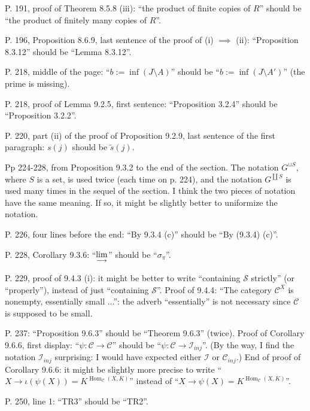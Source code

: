 \documentclass[12pt]{article}
\theoremstyle{remark}%
\newcommand{\n}{\noindent}
\newcommand{\C}{\mathcal C}
\newcommand{\ilim}{\operatornamewithlimits{\underset{\longrightarrow}{lim}}}
\DeclareMathOperator{\Hom}{Hom}
\begin{document}
\n P. 191, proof of Theorem 8.5.8 (iii): ``the product of finite copies of $R$'' should be ``the product of finitely many copies of $R$''.

\n P. 196, Proposition 8.6.9, last sentence of the proof of (i) $\implies$ (ii): ``Proposition 8.3.12'' should be ``Lemma 8.3.12''.

\n P. 218, middle of the page: ``$b:=\inf(J\setminus A)$'' should be ``$b:=\inf(J\setminus A')$'' (the prime is missing).

\n P. 218, proof of Lemma 9.2.5, first sentence: ``Proposition 3.2.4'' should be ``Proposition 3.2.2''.

\n P. 220, part (ii) of the proof of Proposition 9.2.9, last sentence of the first paragraph: $s(j)$ should be $\tilde s(j)$.

\n Pp 224-228, from Proposition 9.3.2 to the end of the section. The notation $G^{\sqcup S}$, where $S$ is a set, is used twice (each time on p. 224), and the notation $G^{\coprod S}$ is used many times in the sequel of the section. I think the two pieces of notation have the same meaning. If so, it might be slightly better to uniformize the notation.

\n P. 226, four lines before the end: ``By 9.3.4 (c)'' should be ``By (9.3.4) (c)''.

\n P. 228, Corollary 9.3.6: ``$\ilim$'' should be ``$\sigma_\pi$''.

\n P. 229, proof of 9.4.3 (i): it might be better to write ``containing $\mathcal S$ strictly'' (or ``properly''), instead of just ``containing $\mathcal S$''. Proof of 9.4.4: ``The category $\C^X$ is nonempty, essentially small ...'': the adverb ``essentially'' is not necessary since $\C$ is supposed to be small.

\n P. 237: ``Proposition 9.6.3'' should be ``Theorem 9.6.3'' (twice). Proof of Corollary 9.6.6, first display: ``$\psi:\C\to\C$'' should be ``$\psi:\C\to\mathcal I_{inj}$''. (By the way, I find the notation $\mathcal I_{inj}$ surprising: I would have expected either $\mathcal I$ or $\C_{inj}$.) End of proof of Corollary 9.6.6: it might be slightly more precise to write ``$X\to\iota(\psi(X))=K^{\Hom_\C(X,K)}$'' instead of ``$X\to\psi(X)=K^{\Hom_\C(X,K)}$''. 

\n P. 250, line 1: ``TR3'' should be ``TR2''.
%
\end{document}
